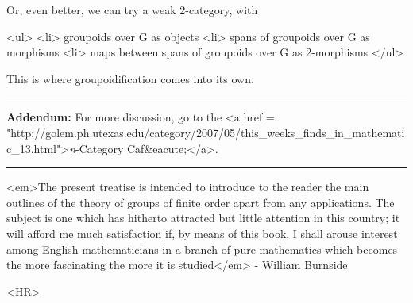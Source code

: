 Or, even better, we can try a weak 2-category, with 

<ul>
<li>
 groupoids over G as objects
<li>
 spans of groupoids over G as morphisms
<li>
 maps between spans of groupoids over G as 2-morphisms
</ul>

This is where groupoidification comes into its own.

\par\noindent\rule{\textwidth}{0.4pt}
\textbf{Addendum:} 
For more discussion, go to the <a href = "http://golem.ph.utexas.edu/category/2007/05/this_weeks_finds_in_mathematic_13.html">\emph{n}-Category
Caf&eacute;</a>.

\par\noindent\rule{\textwidth}{0.4pt}
<em>The present treatise is intended to introduce to the reader the main
outlines of the theory of groups of finite order apart from any applications.
The subject is one which has hitherto attracted but little attention in 
this country; it will afford me much satisfaction if, by means of this
book, I shall arouse interest among English mathematicians in a branch
of pure mathematics which becomes the more fascinating the more it is 
studied</em> - William Burnside

<HR>



